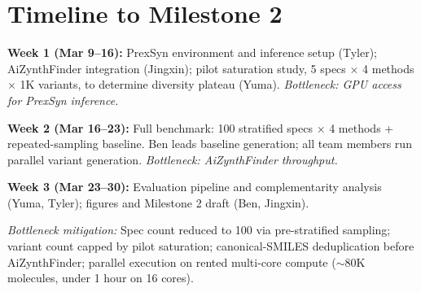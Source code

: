 \section*{Timeline to Milestone 2}

\textbf{Week 1 (Mar 9--16):} PrexSyn environment and inference setup (Tyler); AiZynthFinder integration (Jingxin); pilot saturation study, 5 specs $\times$ 4 methods $\times$ 1K variants, to determine diversity plateau (Yuma). \textit{Bottleneck: GPU access for PrexSyn inference.}

\textbf{Week 2 (Mar 16--23):} Full benchmark: 100 stratified specs $\times$ 4 methods + repeated-sampling baseline. Ben leads baseline generation; all team members run parallel variant generation. \textit{Bottleneck: AiZynthFinder throughput.}

\textbf{Week 3 (Mar 23--30):} Evaluation pipeline and complementarity analysis (Yuma, Tyler); figures and Milestone 2 draft (Ben, Jingxin).

\textit{Bottleneck mitigation:} Spec count reduced to 100 via pre-stratified sampling; variant count capped by pilot saturation; canonical-SMILES deduplication before AiZynthFinder; parallel execution on rented multi-core compute ($\sim$80K molecules, under 1 hour on 16 cores).
